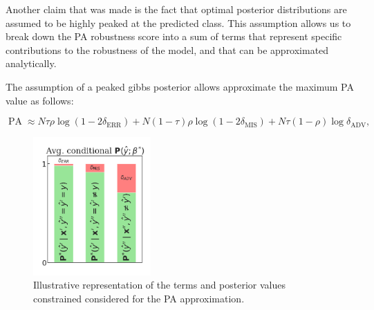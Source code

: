 Another claim that was made is the fact that optimal posterior distributions are
assumed to be highly peaked at the predicted class. This assumption allows us to
break down the PA robustness score into a sum of terms that represent specific
contributions to the robustness of the model, and that can be approximated
analytically.

\begin{theorem}
    The assumption of a peaked gibbs posterior allows approximate the maximum PA value as follows:

    $$
        \operatorname{PA} \approx N\tau \rho \log \left( 1 - 2\delta_{\text{ERR}} \right) + N(1- \tau) \rho \log \left( 1 - 2\delta_{\text{MIS}} \right)  + N\tau (1 - \rho) \log \delta_{\text{ADV}},
    $$
\end{theorem}
\begin{figure}[H]
    \centering
    \includegraphics[width=0.4\textwidth]{img/results_discussion/adversarial/demonstration.png}
    \caption{Illustrative representation of the terms and posterior values constrained
    considered for the PA approximation.
    }
    \label{fig:appendix_adv_illustration}
\end{figure}
